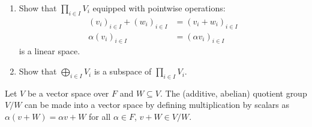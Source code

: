     \newpage
    \begin{exercise}
        \phantom{a}
        \begin{enumerate}[label = (\arabic*),itemsep=1pt,topsep=3pt]
            \item Show that $\prod_{i \in I}V_i$ equipped with pointwise operations:
                \begin{equation*}
                \begin{split}
                    (v_i)_{i \in I} + (w_i)_{i \in I} &= (v_i + w_i)_{i \in I} \\
                    \alpha(v_i)_{i \in I} &= (\alpha v_i)_{i \in I}
                \end{split}
                \end{equation*}
            is a linear space.

            \item Show that $\bigoplus_{i \in I}V_i$ is a subspace of $\prod_{i \in I}V_i$.
        \end{enumerate}
    \end{exercise}

    \begin{proposition}
        Let $V$ be a vector space over $F$ and $W \subseteq V$. The (additive, abelian) quotient group $V/W$ can be made into a vector space by defining multiplication by scalars as $\alpha(v + W) = \alpha v + W$ for all $\alpha \in F$, $v + W \in V/W$.
    \end{proposition}

